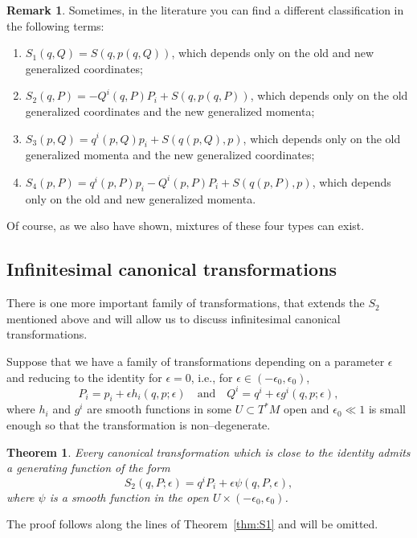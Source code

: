 \documentclass[english,fontsize=11pt,paper=b5]{scrbook}
\newtheorem{theorem}{Theorem}[chapter]
\theoremstyle{definition}
\newtheorem{remark}{Remark}[chapter]
\begin{document}
    \begin{remark}
      Sometimes, in the literature you can find a different classification in the following terms:
      \begin{enumerate}
        \item $S_1(q,Q) = S(q,p(q,Q))$, which depends only on the old and new generalized coordinates;
        \item $S_2(q,P) = - Q^i(q,P) P_i + S(q,p(q,P))$, which depends only on the old generalized coordinates and the new generalized momenta;
        \item $S_3(p,Q) = q^i(p,Q) p_i + S(q(p,Q),p)$, which depends only on the old generalized momenta and the new generalized coordinates;
        \item $S_4(p,P) = q^i(p,P) p_i - Q^i(p,P) P_i + S(q(p,P),p)$, which depends only on the old and new generalized momenta.
      \end{enumerate}
      Of course, as we also have shown, mixtures of these four types can exist.
    \end{remark}

    \subsection{Infinitesimal canonical transformations}

    There is one more important family of transformations, that extends the $S_2$ mentioned above and will allow us to discuss infinitesimal canonical transformations.

    Suppose that we have a family of transformations depending on a parameter $\epsilon$ and reducing to the identity for $\epsilon = 0$, i.e., for $\epsilon \in (-\epsilon_0, \epsilon_0)$,
    \begin{equation}\label{eq:infcantraf}
      P_i = p_i + \epsilon h_i(q,p;\epsilon) \quad\mbox{and}\quad
      Q^i = q^i + \epsilon g^i(q,p; \epsilon),
    \end{equation}
    where $h_i$ and $g^i$ are smooth functions in some $U\subset T^*M$ open and $\epsilon_0 \ll 1$ is small enough so that the transformation is non--degenerate.

    \begin{theorem}
      Every canonical transformation which is close to the identity admits a generating function of the form
      \begin{equation}\label{eq:infS2}
        S_2(q, P; \epsilon) = q^i P_i + \epsilon \psi(q,P,\epsilon),
      \end{equation}
      where $\psi$ is a smooth function in the open $U\times(-\epsilon_0,\epsilon_0)$.
    \end{theorem}
    The proof follows along the lines of Theorem~\ref{thm:S1} and will be omitted.
\end{document}
